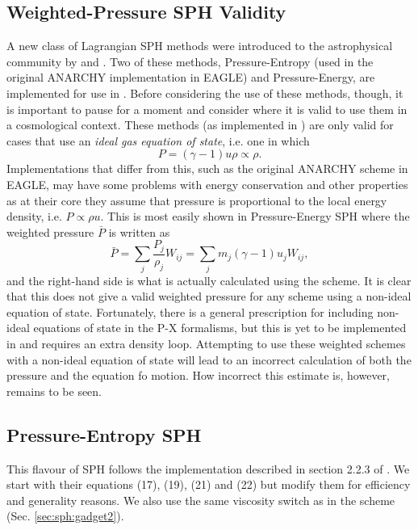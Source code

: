 \subsection{Weighted-Pressure SPH Validity}

A new class of Lagrangian SPH methods were introduced to the astrophysical
community by \citet{Hopkins2013} and \citet{Saitoh2013}. Two of these methods,
Pressure-Entropy (used in the original ANARCHY implementation in EAGLE) and
Pressure-Energy, are implemented for use in \swift{}. Before considering the
use of these methods, though, it is important to pause for a moment and
consider where it is valid to use them in a cosmological context. These methods
(as implemented in \swift{}) are only valid for cases that use an \emph{ideal
gas equation of state}, i.e. one in which
\begin{equation}
  P = (\gamma - 1) u \rho \propto \rho.
  \nonumber
\end{equation}
Implementations that differ from this, such as the original ANARCHY scheme in
EAGLE, may have some problems with energy conservation \cite[see][]{Hosono2013}
and other properties as at their core they assume that pressure is proportional
to the local energy density, i.e. $P \propto \rho u$. This is most easily shown
in Pressure-Energy SPH where the weighted pressure $\bar{P}$ is written as
\begin{equation}
  \bar{P} = \sum_j \frac{P_j}{\rho_j} W_{ij} = \sum_j m_j (\gamma - 1) u_j
W_{ij},
\end{equation}
and the right-hand side is what is actually calculated using the scheme. It is 
clear that this does not give a valid weighted pressure for any scheme using a
non-ideal equation of state. Fortunately, there is a general prescription for
including non-ideal equations of state in the P-X formalisms, but this is yet
to be implemented in \swift{} and requires an extra density loop. Attempting to
use these weighted schemes with a non-ideal equation of state will lead to an
incorrect calculation of both the pressure and the equation fo motion. How
incorrect this estimate is, however, remains to be seen.


\subsection{Pressure-Entropy SPH}
\label{sec:sph:pe}

This flavour of SPH follows the implementation described in section
2.2.3 of \cite{Hopkins2013}. We start with their equations (17), (19),
(21) and (22) but modify them for efficiency and generality
reasons. We also use the same \cite{Balsara1995} viscosity switch as
in the \GadgetSPH scheme (Sec. \ref{sec:sph:gadget2}).


